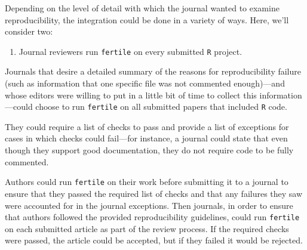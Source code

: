 \documentclass[12pt,twoside]{reedthesis}
\providecommand{\tightlist}{%
  \setlength{\itemsep}{0pt}\setlength{\parskip}{0pt}}
\begin{document}
Depending on the level of detail with which the journal wanted to examine reproducibility, the integration could be done in a variety of ways. Here, we'll consider two:
\begin{enumerate}
\def\labelenumi{\arabic{enumi}.}
\tightlist
\item
  Journal reviewers run \texttt{fertile} on every submitted \texttt{R} project.
\end{enumerate}
Journals that desire a detailed summary of the reasons for reproducibility failure (such as information that one specific file was not commented enough)---and whose editors were willing to put in a little bit of time to collect this information---could choose to run \texttt{fertile} on all submitted papers that included \texttt{R} code.

They could require a list of checks to pass and provide a list of exceptions for cases in which checks could fail---for instance, a journal could state that even though they support good documentation, they do not require code to be fully commented.

Authors could run \texttt{fertile} on their work before submitting it to a journal to ensure that they passed the required list of checks and that any failures they saw were accounted for in the journal exceptions. Then journals, in order to ensure that authors followed the provided reproducibility guidelines, could run \texttt{fertile} on each submitted article as part of the review process. If the required checks were passed, the article could be accepted, but if they failed it would be rejected.
\end{document}
